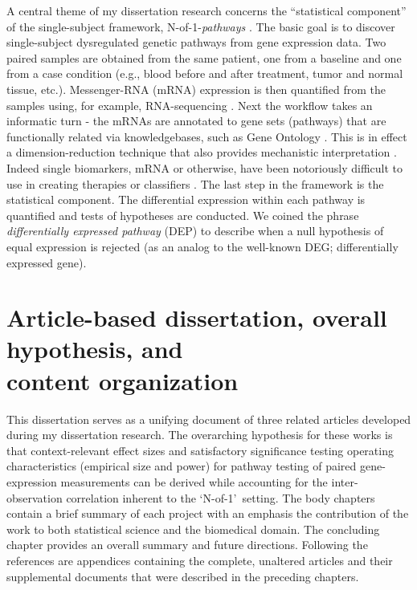 \indent \indent A central theme of my dissertation research concerns the ``statistical component'' of the single-subject framework, N-of-1-\emph{pathways} \citep{Gardeux2014}. The basic goal is to discover single-subject dysregulated genetic pathways from gene expression data. Two paired samples are obtained from the same patient, one from a baseline and one from a case condition (e.g., blood before and after treatment, tumor and normal tissue, etc.). Messenger-RNA (mRNA) expression is then quantified from the samples using, for example, RNA-sequencing \citep{Wang2009}. Next the workflow takes an informatic turn - the mRNAs are annotated to gene sets (pathways) that are functionally related via knowledgebases, such as Gene Ontology \citep{Ashburner2000}. This is in effect a dimension-reduction technique that also provides mechanistic interpretation \citep{Mooney2015}. Indeed single biomarkers, mRNA or otherwise, have been notoriously difficult to use in creating therapies or classifiers \citep{Kern2012}. The last step in the framework is the statistical component. The differential expression within each pathway is quantified and tests of hypotheses are conducted. We coined the phrase \emph{differentially expressed pathway} (DEP) to describe when a null hypothesis of equal expression is rejected (as an analog to the well-known DEG; differentially expressed gene). 

\section{Article-based dissertation, overall hypothesis, and \\content organization}\label{sec:org}
\indent \indent This dissertation serves as a unifying document of three related articles developed during my dissertation research. The overarching hypothesis for these works is that context-relevant effect sizes and satisfactory significance testing operating characteristics (empirical size and power) for pathway testing of paired gene-expression measurements can be derived while accounting for the inter-observation correlation inherent to the \lq N-of-1\rq~setting. The body chapters contain a brief summary of each project with an emphasis the contribution of the work to both statistical science and the biomedical domain. The concluding chapter provides an overall summary and future directions. Following the references are appendices containing the complete, unaltered articles and their supplemental documents that were described in the preceding chapters. 
